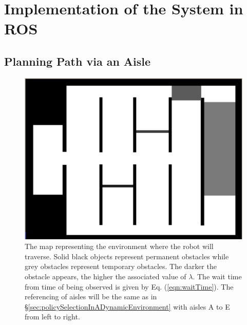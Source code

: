 \documentclass[a4paper,12pt]{article}
\begin{document}
	
	\section{Implementation of the System in ROS}
	\label{sec:implementationInROS}
		\subsection{Planning Path via an Aisle}
		\label{sec:planningPathViaAisleROS}
			\begin{figure}[H]
				\centering
				\includegraphics[width=.5\textwidth]{images/stdr_map.png}
				\caption{The map representing the environment where the robot will traverse. Solid black objects represent permanent obstacles while grey obstacles represent temporary obstacles. The darker the obstacle appears, the higher the associated value of $\lambda$. The wait time from time of being observed is given by Eq. (\ref{eqn:waitTime}). The referencing of aisles will be the same as in \S \ref{sec:policySelectionInADynamicEnvironment} with aisles A to E from left to right.}
				\label{fig:stdrMap}
			\end{figure}
			
\end{document}

